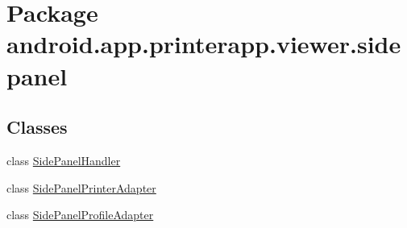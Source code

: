 \hypertarget{namespaceandroid_1_1app_1_1printerapp_1_1viewer_1_1sidepanel}{}\section{Package android.\+app.\+printerapp.\+viewer.\+sidepanel}
\label{namespaceandroid_1_1app_1_1printerapp_1_1viewer_1_1sidepanel}
\subsection*{Classes}
\begin{DoxyCompactItemize}
\item 
class \hyperlink{classandroid_1_1app_1_1printerapp_1_1viewer_1_1sidepanel_1_1_side_panel_handler}{Side\+Panel\+Handler}
\item 
class \hyperlink{classandroid_1_1app_1_1printerapp_1_1viewer_1_1sidepanel_1_1_side_panel_printer_adapter}{Side\+Panel\+Printer\+Adapter}
\item 
class \hyperlink{classandroid_1_1app_1_1printerapp_1_1viewer_1_1sidepanel_1_1_side_panel_profile_adapter}{Side\+Panel\+Profile\+Adapter}
\end{DoxyCompactItemize}
